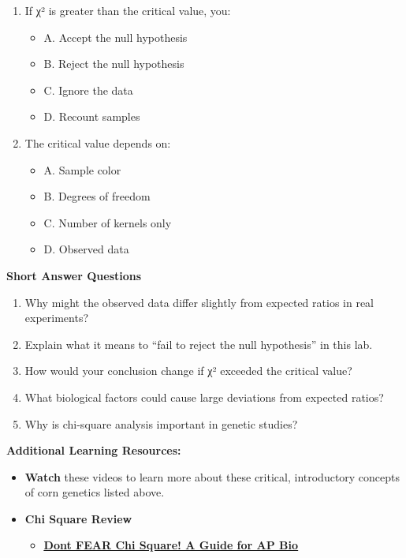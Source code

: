 \documentclass[
  letterpaper,
  DIV=11,
  numbers=noendperiod]{scrreprt}
\providecommand{\tightlist}{%
  \setlength{\itemsep}{0pt}\setlength{\parskip}{0pt}}
\begin{document}
\begin{enumerate}
\def\labelenumi{\arabic{enumi}.}
\item
  If χ² is greater than the critical value, you:

  \begin{itemize}
  \item
    A. Accept the null hypothesis
  \item
    B. Reject the null hypothesis
  \item
    C. Ignore the data
  \item
    D. Recount samples
  \end{itemize}
\item
  The critical value depends on:

  \begin{itemize}
  \item
    A. Sample color
  \item
    B. Degrees of freedom
  \item
    C. Number of kernels only
  \item
    D. Observed data
  \end{itemize}
\end{enumerate}

\textbf{Short Answer Questions}

\begin{enumerate}
\def\labelenumi{\arabic{enumi}.}
\item
  Why might the observed data differ slightly from expected ratios in
  real experiments?
\item
  Explain what it means to ``fail to reject the null hypothesis'' in
  this lab.
\item
  How would your conclusion change if χ² exceeded the critical value?
\item
  What biological factors could cause large deviations from expected
  ratios?
\item
  Why is chi-square analysis important in genetic studies?
\end{enumerate}

\textbf{\hfill\break
}

\textbf{Additional Learning Resources:}

\begin{itemize}
\item
  \textbf{Watch} these videos to learn more about these critical,
  introductory concepts of corn genetics listed above.
\item
  \textbf{Chi Square Review}

  \begin{itemize}
  \tightlist
  \item
    \href{https://www.youtube.com/watch?v=Yrul3Jl2mVU}{\textbf{\ul{Don\textquotesingle t
    FEAR Chi Square! A Guide for AP Bio}}}
  \end{itemize}
\end{itemize}
\end{document}
